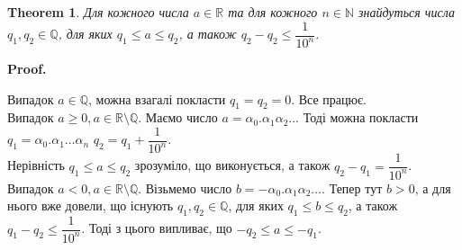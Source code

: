 \documentclass[a4paper, 14pt]{article}
\makeatletter
\def\qed{$\blacksquare$}
\theoremstyle{theoremdd}
\newtheorem{theorem}{Theorem}[subsection]
\theoremstyle{theoremdd}
\theoremstyle{theoremdd}
\theoremstyle{theoremdd}
\theoremstyle{theoremdd}
\theoremstyle{theoremdd}
\theoremstyle{theoremdd}
\theoremstyle{theoremdd}
\newtheorem{corollary}[theorem]{Corollary}
\renewenvironment{proof}[1][Proof.\\]{\par
\pushQED{\hfill \qed}%
\normalfont \topsep6\p@\@plus6\p@\relax
\trivlist
\item\relax
{\bfseries
#1\@addpunct{.}}\hspace\labelsep\ignorespaces
}{%
\popQED\endtrivlist\@endpefalse
}
\makeatother
\begin{document}
\iffalse
	\begin{corollary}
	Задано такі два числа $a,b \in \mathbb{R}$, що $a < b$. Тоді на інтервалі $(a,b)$ знайдеться принаймні одне ірраціональне число $x \in \mathbb{R} \setminus \mathbb{Q}$.
	\end{corollary}
	
	\begin{proof}
	Оскільки $a < b$, то звідси $\dfrac{a}{\sqrt{2}} < \dfrac{b}{\sqrt{2}}$. За попереднім наслідком, $\exists q \in \mathbb{Q}: \dfrac{a}{\sqrt{2}} < q < \dfrac{b}{\sqrt{2}}$.\\
	Тоді якщо $x = q \sqrt{2}$, то звідси $a < x < b$. А число $x \in \mathbb{R} \setminus \mathbb{Q}$, бо квадратний корінь є ірраціональним.
	\end{proof}
\fi
	
	\begin{theorem}
	Для кожного числа $a \in \mathbb{R}$ та для кожного $n \in \mathbb{N}$ знайдуться числа $q_1, q_2 \in \mathbb{Q}$, для яких $q_1 \leq a \leq q_2$, а також $q_2 - q_2 \leq \dfrac{1}{10^n}$.
	\end{theorem}
	
	\begin{proof}
	Випадок $a \in \mathbb{Q}$, можна взагалі покласти $q_1 = q_2 = 0$. Все працює.\\
	Випадок $a \geq 0, a \in \mathbb{R} \setminus \mathbb{Q}$. Маємо число $a = \alpha_0.\alpha_1 \alpha_2 \dots$ Тоді можна покласти\\
	$q_1 = \alpha_0.\alpha_1 \dots \alpha_n$ \quad $q_2 = q_1 + \dfrac{1}{10^n}$.\\
	Нерівність $q_1 \leq a \leq q_2$ зрозуміло, що виконується, а також $q_2 - q_1 = \dfrac{1}{10^n}$.\\
	Випадок $a < 0, a \in \mathbb{R} \setminus \mathbb{Q}$. Візьмемо число $b = -\alpha_0.\alpha_1 \alpha_2 \dots$. Тепер тут $b > 0$, а для нього вже довели, що існують $q_1,q_2 \in \mathbb{Q}$, для яких $q_1 \leq b \leq q_2$, а також $q_1 - q_2 \leq \dfrac{1}{10^n}$. Тоді з цього випливає, що $-q_2 \leq a \leq -q_1$.
	\end{proof}
	
\end{document}
